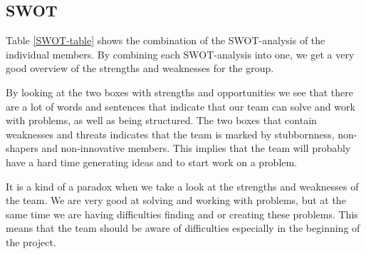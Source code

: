 \subsection{SWOT}

Table \ref{SWOT-table} shows the combination of the SWOT-analysis of the individual members. By combining each SWOT-analysis into one, we get a very good overview of the strengths and weaknesses for the group.

By looking at the two boxes with strengths and opportunities we see that there are a lot of words and sentences that indicate that our team can solve and work with problems, as well as being structured.
The two boxes that contain weaknesses and threats indicates that the team is marked by stubbornness, non-shapers and non-innovative members. This implies that the team will probably  have a hard time generating ideas and to start work on a problem. 

It is a kind of a paradox when we take a look at the strengths and weaknesses of the team. We are very good at solving and working with problems, but at the same time we are having difficulties finding and or creating these problems. This means that the team should be aware of difficulties especially in the beginning of the project.

